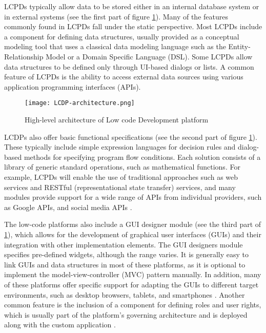 LCPDs typically allow data to be stored either in an internal database system or in external systems (see the first part of figure \ref{fig:background:architecture}). 
Many of the features commonly found in LCPDs fall under the static perspective. 
Most LCPDs include a component for defining data structures, usually provided as a conceptual modeling tool that uses a classical data modeling language such as the Entity-Relationship Model or a Domain Specific Language (DSL). 
Some LCPDs allow data structures to be defined only through UI-based dialogs or lists. 
A common feature of LCPDs is the ability to access external data sources using various application programming interfaces (APIs).
\begin{figure}[htbp!]
  \centering
  \texttt{[image: LCDP-architecture.png]}
  \caption[LCDP architecture]{High-level architecture of Low code Development platform}
  \label{fig:background:architecture}
\end{figure}

LCDPs also offer basic functional specifications (see the second part of figure \ref{fig:background:architecture}). 
These typically include simple expression languages for decision rules and dialog-based methods for specifying program flow conditions. 
Each solution consists of a library of generic standard operations, such as mathematical functions. 
For example, LCPDs will enable the use of traditional approaches such as web services and RESTful (representational state transfer) services, and many modules provide support for a wide range of APIs from individual providers, such as Google APIs, and social media APIs \cite{misc:lowcode:platforms}.

The low-code platforms also include a GUI designer module (see the third part of \ref{fig:background:architecture}), which allows for the development of graphical user interfaces (GUIs) and their integration with other implementation elements. 
The GUI designers module specifies pre-defined widgets, although the range varies. 
It is generally easy to link GUIs and data structures in most of these platforms, as it is optional to implement the model-view-controller (MVC) pattern manually.
In addition, many of these platforms offer specific support for adapting the GUIs to different target environments, such as desktop browsers, tablets, and smartphones \cite{paper:lowcode:cabot}.
Another common feature is the inclusion of a component for defining roles and user rights, which is usually part of the platform's governing architecture and is deployed along with the custom application \cite{article:nocode:sahina}.

